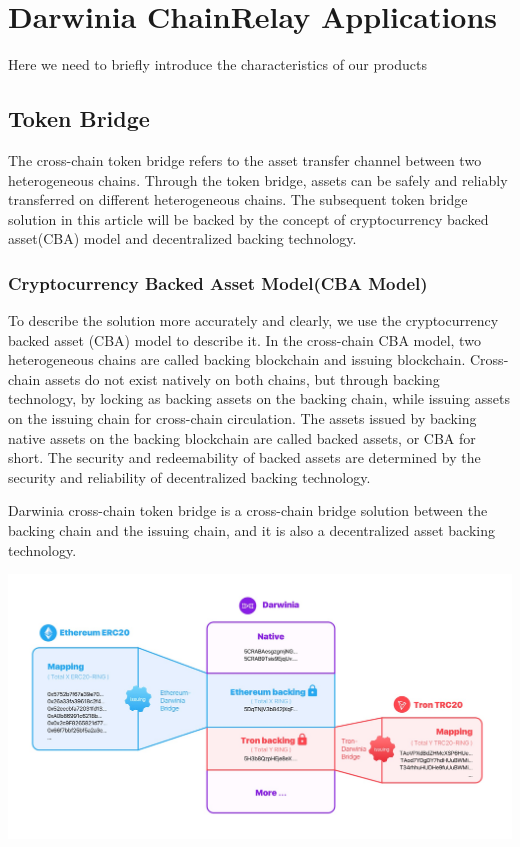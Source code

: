 \section{Darwinia ChainRelay Applications}

Here we need to briefly introduce the characteristics of our products

\subsection*{Token Bridge}

The cross-chain token bridge refers to the asset transfer channel between two heterogeneous chains. Through the token bridge, assets can be safely and reliably transferred on different heterogeneous chains. The subsequent token bridge solution in this article will be backed by the concept of cryptocurrency backed asset(CBA) model and decentralized backing technology.

\subsubsection*{Cryptocurrency Backed Asset Model(CBA Model)}

To describe the solution more accurately and clearly, we use the cryptocurrency backed asset (CBA) model to describe it. In the cross-chain CBA model, two heterogeneous chains are called backing blockchain and issuing blockchain. Cross-chain assets do not exist natively on both chains, but through backing technology, by locking as backing assets on the backing chain, while issuing assets on the issuing chain for cross-chain circulation. The assets issued by backing native assets on the backing blockchain are called backed assets, or CBA for short. The security and redeemability of backed assets are determined by the security and reliability of decentralized backing technology.

Darwinia cross-chain token bridge is a cross-chain bridge solution between the backing chain and the issuing chain, and it is also a decentralized asset backing technology.

    \includegraphics[scale=0.12]{pic/tokenbank.jpg}


